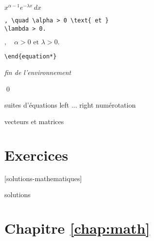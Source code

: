 \begin{exemple}
\begin{demo}
\begin{texoutput}{0.38\linewidth}
      $\displaystyle x^{\alpha - 1} e^{-\lambda x}\, dx$
    \end{texoutput}
  \item
    \begin{texinput}{0.58\linewidth}
\begin{lstlisting}
, \quad \alpha > 0 \text{ et }
\lambda > 0.
\end{lstlisting}
    \end{texinput}
    \hfill
    \begin{texoutput}{0.38\linewidth}
      $, \quad \alpha > 0 \text{ et } \lambda > 0.$
    \end{texoutput}
  \item
    \begin{texinput}{0.58\linewidth}
\begin{lstlisting}
\end{equation*}
\end{lstlisting}
    \end{texinput}
    \hfill
    \begin{texoutput}{0.38\linewidth}
      \emph{fin de l'environnement}
    \end{texoutput}
  \end{demo}
  \qed
\end{exemple}


suites d'équations
  left ... right
  numérotation

vecteurs et matrices


\section{Exercices}
\label{sec:math:exercices}

[solutions-mathematiques]

\begin{Filesave}{solutions}
\section*{Chapitre \ref*{chap:math}}

\end{Filesave}





